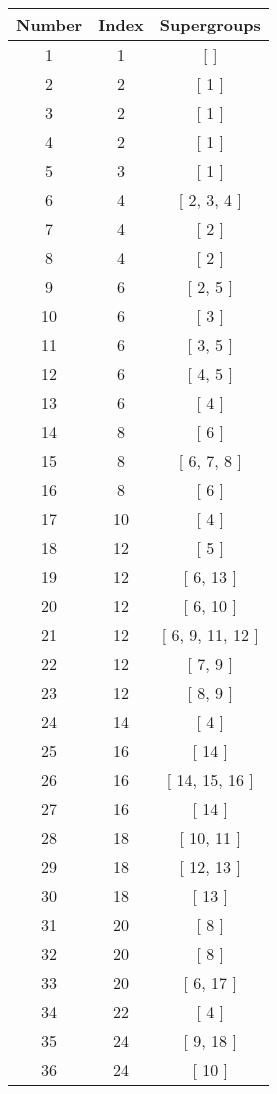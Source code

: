 \begin{center}
\begin{longtable}[H]{|| c c c ||}
\hline
Number &  Index &  Supergroups
\\\hline
1 & 1 & [  ]
\\\hline
2 & 2 & [ 1 ]
\\\hline
3 & 2 & [ 1 ]
\\\hline
4 & 2 & [ 1 ]
\\\hline
5 & 3 & [ 1 ]
\\\hline
6 & 4 & [ 2, 3, 4 ]
\\\hline
7 & 4 & [ 2 ]
\\\hline
8 & 4 & [ 2 ]
\\\hline
9 & 6 & [ 2, 5 ]
\\\hline
10 & 6 & [ 3 ]
\\\hline
11 & 6 & [ 3, 5 ]
\\\hline
12 & 6 & [ 4, 5 ]
\\\hline
13 & 6 & [ 4 ]
\\\hline
14 & 8 & [ 6 ]
\\\hline
15 & 8 & [ 6, 7, 8 ]
\\\hline
16 & 8 & [ 6 ]
\\\hline
17 & 10 & [ 4 ]
\\\hline
18 & 12 & [ 5 ]
\\\hline
19 & 12 & [ 6, 13 ]
\\\hline
20 & 12 & [ 6, 10 ]
\\\hline
21 & 12 & [ 6, 9, 11, 12 ]
\\\hline
22 & 12 & [ 7, 9 ]
\\\hline
23 & 12 & [ 8, 9 ]
\\\hline
24 & 14 & [ 4 ]
\\\hline
25 & 16 & [ 14 ]
\\\hline
26 & 16 & [ 14, 15, 16 ]
\\\hline
27 & 16 & [ 14 ]
\\\hline
28 & 18 & [ 10, 11 ]
\\\hline
29 & 18 & [ 12, 13 ]
\\\hline
30 & 18 & [ 13 ]
\\\hline
31 & 20 & [ 8 ]
\\\hline
32 & 20 & [ 8 ]
\\\hline
33 & 20 & [ 6, 17 ]
\\\hline
34 & 22 & [ 4 ]
\\\hline
35 & 24 & [ 9, 18 ]
\\\hline
36 & 24 & [ 10 ]
\\\hline

\end{longtable}
\end{center}
